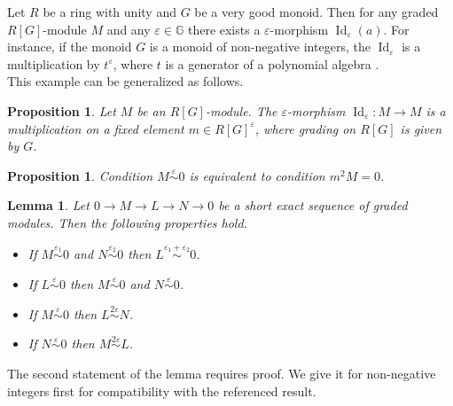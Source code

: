 \documentclass[english,12pt]{article}
\newcounter{stmcounter}[section]
\numberwithin{equation}{section}
\newtheorem{proposition}[stmcounter]{Proposition}
\newtheorem{lemma}[stmcounter]{Lemma}
\theoremstyle{definition}
\theoremstyle{remark}
\begin{document}
Let $R$ be a ring with unity and $G$ be a very good monoid. Then for any graded $R[G]$-module $M$ and any $\varepsilon \in \mathbb{G}$ there exists a $\varepsilon$-morphism $\operatorname{Id}_{\varepsilon}(a)$. For instance, if the monoid $G$ is a monoid of non-negative integers, the $\operatorname{Id}_{\varepsilon}$ is a multiplication by $t^{\varepsilon}$, where $t$ is a generator of a polynomial algebra {\cite[Example 2.8]{GS16}}.\\

This example can be generalized as follows.

\begin{proposition} \cite[Following the Equation 4]{Corbet18}
  \label{mult}
  Let $M$ be an $R[G]$-module. The $\varepsilon$-morphism $\operatorname{Id}_{\varepsilon} : M \to M$ is a multiplication on a fixed element $m \in R[G]^{\varepsilon}$, where grading on $R[G]$ is given by $G$.
\end{proposition}

\begin{proposition} {\cite[Proposition 2.13]{GS16}}
  \label{epstriv}
  Condition $M \stackrel{\varepsilon}{\sim} 0$ is equivalent to condition $m^2M = 0$.
\end{proposition}

\begin{lemma}
  \label{ops}
  Let $0 \to M \to L \to N \to 0$ be a short exact sequence of graded modules. Then the following properties hold.
  \begin{itemize}
    \item If $M \stackrel{\varepsilon_1}{\sim} 0$ and $N \stackrel{\varepsilon_2}{\sim} 0$ then $L \stackrel{\varepsilon_1 + \varepsilon_2}{\sim} 0$. {\cite[Proposition 4.6]{GS16}}
    \item If $L \stackrel{\varepsilon}{\sim} 0$ then $M \stackrel{\varepsilon}{\sim} 0$ and $N \stackrel{\varepsilon}{\sim} 0$.
    \item If $M \stackrel{\varepsilon}{\sim} 0$ then $L \stackrel{2\varepsilon}{\sim} N$. {\cite[Proposition 4.1]{GS16}}
    \item If $N \stackrel{\varepsilon}{\sim} 0$ then $M \stackrel{2\varepsilon}{\sim} L$. {\cite[Proposition 4.1]{GS16}}
  \end{itemize}
\end{lemma}

The second statement of the lemma requires proof. We give it for non-negative integers first for compatibility with the referenced result. 
\end{document}

